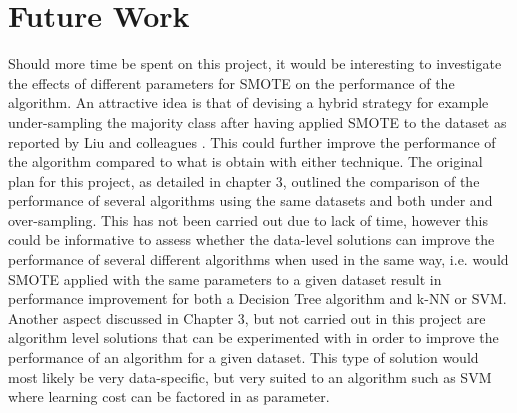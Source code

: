 \section{Future Work}
Should more time be spent on this project, it would be interesting to investigate the effects of different parameters for SMOTE on the performance of the algorithm.
An attractive idea is that of devising a hybrid strategy for example under-sampling the majority class after having applied SMOTE to the dataset as reported by Liu and colleagues \citep{Liu:2006ij}. This could further improve the performance of the algorithm compared to what is obtain with either technique.\newline
The original plan for this project, as detailed in chapter 3, outlined the comparison of the performance of several algorithms using the same datasets and both under and over-sampling. This has not been carried out due to lack of time, however this could be informative to assess whether the data-level solutions can improve the performance of several different algorithms when used in the same way, i.e. would SMOTE applied with the same parameters to a given dataset result in performance improvement for both a Decision Tree algorithm and k-NN or SVM.\newline
Another aspect discussed in Chapter 3, but not carried out in this project are algorithm level solutions that can be experimented with in order to improve the performance of an algorithm for a given dataset. This type of solution would most likely be very data-specific, but very suited to an algorithm such as SVM where learning cost can be factored in as parameter.


